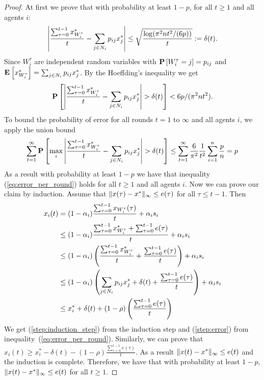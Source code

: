 \begin{proof}
At first we prove that with probability at least $1-p$,
for all $t \geq 1$ and all agents $i$:
\begin{equation}\label{eq:error_per_round}
    \left|
    \frac{\sum_{\tau=0}^{t-1} x^*_{W_i^\tau}}{t} -
    \sum_{j \in N_i} p_{ij} x^*_j
    \right| \leq
    \sqrt{ \frac{\log(\pi^2 n t^2/(6 p))}{t}} :=
    \delta(t).
\end{equation}
Since $W_i^\tau$ are independent random variables with
$\bm{\mathrm{P}}\left[W_i^\tau = j\right]=p_{ij}$ and \(\Exp{x^*_{W_i^\tau}} = \sum_{j \in N_i} p_{ij} x^*_j\).
By the Hoeffding's inequality we get
  \[
    \bm{\mathrm{P}}\left[
      \left|
      \frac{\sum_{\tau=0}^{t-1} x^*_{W_i^\tau}}{t}
      - \sum_{j \in N_i} p_{ij} x^*_j \right|
      > \delta(t)
     \right]
    < 6 p / (\pi^2 n t^2).
  \]
To bound the probability of error for all rounds $t=1$ to $\infty$
and all agents $i$, we apply the union bound
  \begin{align*}
    \sum_{t=1}^{\infty}
    \bm{\mathrm{P}}\left[ \max_{i}
      \left|
      \frac{\sum_{\tau=0}^{t-1} x^*_{W_i^{\tau}}}{t}
      - \sum_{j \in N_i} p_{ij} x^*_j \right|
      > \delta(t)\right]
    \leq
    \sum_{t=1}^{\infty} \frac{6}{\pi^2} \frac{1}{t^2} \sum_{i=1}^n \frac{p}{n} =
    p
  \end{align*}
As a result with probability at least $1-p$ we have that
inequality (\ref{eq:error_per_round}) holds for all $t\geq 1$ and all
agents $i$.
Now we can prove our claim by induction.
Assume that $\| x(\tau)-x^* \|_{\infty} \leq e(\tau)$ for all
$\tau \leq t-1$. Then
\begin{align}
    x_i(t)
    &=
    (1-\alpha_i)\frac{\sum_{\tau=0}^{t-1}x_{W_i^{\tau}}(\tau)}{t}
    + \alpha_i s_i \nonumber \\
    &\leq
    (1-\alpha_i)\frac{\sum_{\tau=0}^{t-1}x^*_{W_i^{\tau}} +
      \sum_{\tau=0}^{t-1} e(\tau)}{t} + \alpha_i s_i \label{step:induction_step}\\
    &\leq
    (1-\alpha_i)
    \left(
    \frac{\sum_{\tau=0}^{t-1}x^*_{W_i^{\tau}}}{t}+
    \frac{\sum_{\tau=0}^{t-1} e(\tau)}{t}
    \right)
    + \alpha_i s_i \nonumber\\
    &\leq
    (1-\alpha_i)\left(\sum_{j \in N_i} p_{ij} x^*_{j} +
    \delta(t) + \frac{\sum_{\tau=0}^{t-1} e(\tau)}{t} \right) +
    \alpha_i s_i \label{step:error} \\
    &\leq
    x_i^* + \delta(t) + (1-\rho)
    \left(
    \frac{\sum_{\tau=0}^{t-1} e(\tau)}{t}
    \right)
    \nonumber
  \end{align}
  We get (\ref{step:induction_step}) from the induction step and
  (\ref{step:error}) from inequality~(\ref{eq:error_per_round}).
  Similarly, we can prove that
  $x_i(t) \geq x_i^* - \delta(t) - (1-\rho)
  \frac{\sum_{\tau=0}^{t-1} e(\tau)}{t}$.
  As a result $\| x(t)-x^* \|_{\infty} \leq e(t)$ and the induction
  is complete.  Therefore, we have that with probability at least $1-p$,
  \(\| x(t) - x^* \|_{\infty} \leq e(t)\) for all $t\geq 1$.
\end{proof}

